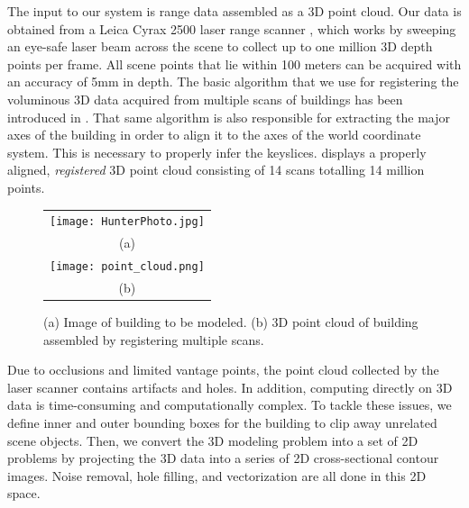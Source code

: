 
\label{sec:prep}

The input to our system is range data assembled as a 3D point cloud.
Our data is obtained from a Leica Cyrax 2500 laser range scanner \cite{RDP_LRS},
which works by sweeping an eye-safe laser beam across the scene to collect
up to one million 3D depth points per frame.
All scene points that lie within 100 meters can be acquired with an accuracy
of 5mm in depth.
The basic algorithm that we use for registering the voluminous 3D data
acquired from multiple scans of buildings has been introduced in
\cite{RDP_LS}.
That same algorithm is also responsible for extracting the major axes
of the building in order to align it to the axes of the world coordinate
system.
This is necessary to properly infer the keyslices.
 displays a properly aligned, {\it registered} 3D point cloud
consisting of 14 scans totalling 14 million points.

\begin{figure}[htbp]
\begin{center}
\begin{tabular}{c}
	\texttt{[image: HunterPhoto.jpg]} \\
	(a)\\
	\texttt{[image: point\_cloud.png]} \\
	(b)
\end{tabular}
\end{center}
\caption{
(a) Image of building to be modeled.
(b) 3D point cloud of building assembled by registering multiple scans.
}
\label{fig:IR_2_DXF}
\end{figure}

Due to occlusions and limited vantage points, the point cloud collected by the
laser scanner contains artifacts and holes.
In addition, computing directly on 3D data is time-consuming and
computationally complex.
To tackle these issues, we define inner and outer bounding boxes for the
building to clip away unrelated scene objects.
Then, we convert the 3D modeling problem into a set of 2D problems by
projecting the 3D data into a series of 2D cross-sectional contour images.
Noise removal, hole filling, and vectorization are all done in this
2D space.

